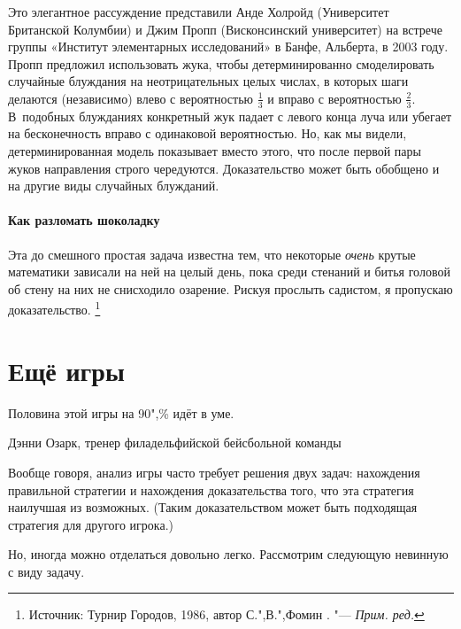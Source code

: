\documentclass[twoside]{book}
\begin{document}
Это элегантное рассуждение представили
Анде Холройд (Университет Британской Колумбии) и Джим Пропп (Висконсинский университет) на встрече группы «Институт элементарных исследований» в Банфе, Альберта, в 2003 году. %
Пропп предложил использовать жука, чтобы детерминированно смоделировать случайные блуждания на неотрицательных целых числах, в которых шаги делаются (независимо) влево с вероятностью $\tfrac13$ и вправо с вероятностью $\tfrac23$.
В~подобных блужданиях конкретный жук падает с левого конца луча или убегает на бесконечность вправо с одинаковой вероятностью.
Но, как мы видели, детерминированная модель показывает вместо этого, что после первой пары жуков направления строго чередуются.
Доказательство может быть обобщено и на другие виды случайных блужданий.

\subsubsection*{Как разломать шоколадку}%

Эта до смешного простая задача известна тем, что некоторые \emph{очень} крутые математики зависали на ней на целый день, пока среди  стенаний и битья головой об стену на них не снисходило озарение.
Рискуя прослыть садистом, я пропускаю доказательство.%
\footnote{Источник: Турнир Городов, 1986, автор  С.",В.",Фомин \cite[№97909]{problems}. "--- \emph{Прим. ред.}}



\chapter{Ещё игры}


\setlength{\epigraphwidth}{.5\textwidth}
\epigraph{Половина этой игры на 90",\% идёт в уме.\vspace{1ex}}{Дэнни Озарк, тренер филадельфийской бейсбольной команды}

Вообще говоря, анализ игры часто требует решения двух задач: нахождения правильной стратегии и нахождения доказательства того, что эта стратегия наилучшая из возможных.
(Таким доказательством может быть подходящая стратегия для другого игрока.)

Но, иногда можно отделаться довольно легко.
Рассмотрим следующую невинную с виду задачу.
\end{document}
